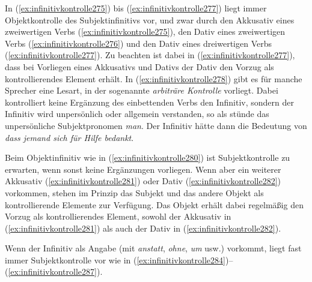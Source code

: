 In (\ref{ex:infinitivkontrolle275}) bis (\ref{ex:infinitivkontrolle277}) liegt immer Objektkontrolle des Subjektinfinitivs vor, und zwar durch den Akkusativ eines zweiwertigen Verbs (\ref{ex:infinitivkontrolle275}), den Dativ eines zweiwertigen Verbs (\ref{ex:infinitivkontrolle276}) und den Dativ eines dreiwertigen Verbs (\ref{ex:infinitivkontrolle277}).
Zu beachten ist dabei in (\ref{ex:infinitivkontrolle277}), dass bei Vorliegen eines Akkusativs und Dativs der Dativ den Vorzug als kontrollierendes Element erhält.
In (\ref{ex:infinitivkontrolle278}) gibt es für manche Sprecher eine Lesart, in der sogenannte \textit{arbiträre Kontrolle} vorliegt.
Dabei kontrolliert keine Ergänzung des einbettenden Verbs den Infinitiv, sondern der Infinitiv wird unpersönlich oder allgemein verstanden, so als stünde das unpersönliche Subjektpronomen \textit{man}.
Der Infinitiv hätte dann die Bedeutung von \textit{dass jemand sich für Hilfe bedankt}.

Beim Objektinfinitiv wie in (\ref{ex:infinitivkontrolle280}) ist Subjektkontrolle zu erwarten, wenn sonst keine Ergänzungen vorliegen.
Wenn aber ein weiterer Akkusativ (\ref{ex:infinitivkontrolle281}) oder Dativ (\ref{ex:infinitivkontrolle282}) vorkommen, stehen im Prinzip das Subjekt und das andere Objekt als kontrollierende Elemente zur Verfügung.
Das Objekt erhält dabei regelmäßig den Vorzug als kontrollierendes Element, sowohl der Akkusativ in (\ref{ex:infinitivkontrolle281}) als auch der Dativ in (\ref{ex:infinitivkontrolle282}).

\begin{exe}
  \ex\label{ex:infinitivkontrolle279}
  \begin{xlist}
  \end{xlist}
\end{exe}

Wenn der Infinitiv als Angabe (mit \textit{anstatt}, \textit{ohne}, \textit{um} usw.) vorkommt, liegt fast immer Subjektkontrolle vor wie in (\ref{ex:infinitivkontrolle284})--(\ref{ex:infinitivkontrolle287}).

\begin{exe}
  \ex\label{ex:infinitivkontrolle283}
  \begin{xlist}
  \end{xlist}
\end{exe}


